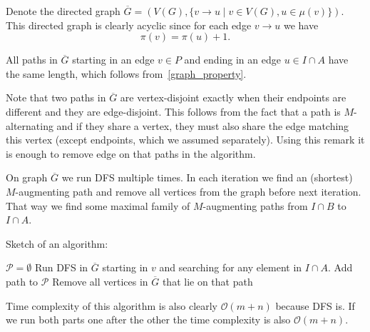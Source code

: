 \begin{exercise}{2}
\begin{enumerate}[i)]
{            Denote the directed graph $\overline{G} = (V(G), \{ v \rightarrow
            u \mid v \in V(G), u \in \mu(v) \} )$. This directed graph is
            clearly acyclic since for each edge $v \rightarrow u$ we have
            \begin{equation}\label{graph_property}
                \pi(v) = \pi(u) + 1.
            \end{equation}

            All paths in $\overline{G}$ starting in an edge $v \in P$ and ending
            in an edge $u \in I \cap A$ have the same length, which follows
            from~\ref{graph_property}.

            Note that two paths in $\overline{G}$ are vertex-disjoint exactly
            when their endpoints are different and they are edge-disjoint. This
            follows from the fact that a path is $M$-alternating and if they
            share a vertex, they must also share the edge matching this vertex
            (except endpoints, which we assumed separately). Using this remark
            it is enough to remove edge on that paths in the algorithm.

            On graph $\overline{G}$ we run DFS multiple times. In each iteration
            we find an (shortest) $M$-augmenting path and remove all vertices
            from the graph before next iteration. That way we find some maximal
            family of $M$-augmenting paths from $I \cap B$ to $I \cap A$.

            Sketch of an algorithm:
            \begin{algorithmic}
                \State $\mathcal{P} = \emptyset$
                    \State Run DFS in $\overline{G}$ starting in $v$
                    and searching for any element in $I \cap A$.
                        \State Add path to $\mathcal{P}$
                        \State Remove all vertices in $\overline{G}$ that lie on that path
                    \EndIf
                \EndFor
            \end{algorithmic}

            Time complexity of this algorithm is also clearly $\mathcal{O}(m +
            n)$ because DFS is. If we run both parts one after the other the
            time complexity is also $\mathcal{O}(m + n)$.

}
\end{enumerate}
\end{exercise}

